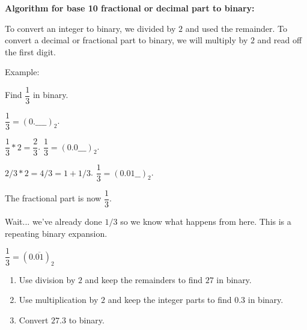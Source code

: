 \documentclass[12pt,letterpaper,noanswers]{exam}
\begin{document}
\textbf{Algorithm for base 10 fractional or decimal part to binary:}

\begin{tcolorbox}
    To convert an integer to binary, we divided by $2$ and used the remainder.  To convert a decimal or fractional part to binary, we will multiply by $2$ and read off the first digit.
\end{tcolorbox}

Example:

Find $\dfrac{1}{3}$ in binary.

$\dfrac{1}{3} = (0. \_ \_ \_ \_)_2$.

$\dfrac{1}{3}*2 = \dfrac{2}{3}$.    $\dfrac{1}{3} = (0.0 \_ \_ \_)_2$.

$2/3 * 2 = 4/3 = 1 + 1/3$.  $\dfrac{1}{3} = (0.01\_ \_)_2$. 

The fractional part is now $\dfrac{1}{3}$. 

Wait... we've already done $1/3$ so we know what happens from here.  This is a repeating binary expansion.  

$\dfrac{1}{3} = (0.\overline{01})_2$

\begin{enumerate}[resume]
    \item Use division by $2$ and keep the remainders to find $27$ in binary.
    \item Use multiplication by $2$ and keep the integer parts to find $0.3$ in binary.
    \item Convert $27.3$ to binary.
\end{enumerate}



\end{document}
